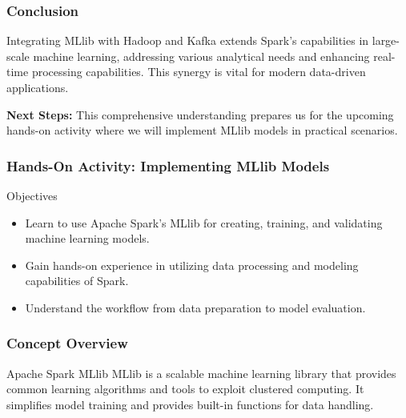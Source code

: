 \documentclass[aspectratio=169]{beamer}
\begin{document}
\begin{frame}[fragile]
    \frametitle{Conclusion}
    Integrating MLlib with Hadoop and Kafka extends Spark's capabilities in large-scale machine learning, addressing various analytical needs and enhancing real-time processing capabilities. This synergy is vital for modern data-driven applications.
    
    \textbf{Next Steps:} This comprehensive understanding prepares us for the upcoming hands-on activity where we will implement MLlib models in practical scenarios.
\end{frame}

\begin{frame}
    \frametitle{Hands-On Activity: Implementing MLlib Models}
    \begin{block}{Objectives}
        \begin{itemize}
            \item Learn to use Apache Spark's MLlib for creating, training, and validating machine learning models.
            \item Gain hands-on experience in utilizing data processing and modeling capabilities of Spark.
            \item Understand the workflow from data preparation to model evaluation.
        \end{itemize}
    \end{block}
\end{frame}

\begin{frame}
    \frametitle{Concept Overview}
    \begin{block}{Apache Spark MLlib}
        MLlib is a scalable machine learning library that provides common learning algorithms and tools to exploit clustered computing. It simplifies model training and provides built-in functions for data handling.
    \end{block}
\end{frame}
\end{document}
